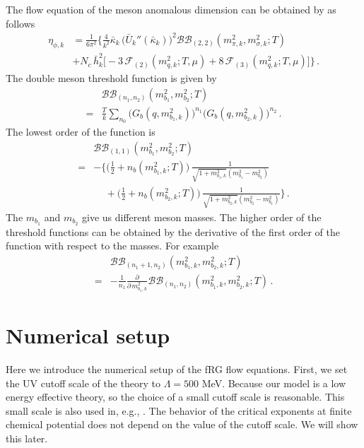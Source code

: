 \documentclass[aps,twocolumn,prd,superscriptaddress,nofootinbib,floatfix]{revtex4-2}
\def\Eq#1{\Cref{#1}}
\begin{document}
The flow equation of the meson anomalous dimension can be obtained by \Eq{eq:eta_phi} as follows
%
\begin{align}
\eta_{\phi,k}&=\frac{1}{6\pi^2}\bigg\{\frac{4}{k^2}\bar{\kappa}_k\,\big(\bar{U}_k''(\bar{\kappa}_k)\big)^2\mathcal{BB}_{(2,2)}(m^2_{\pi,k},m^2_{\sigma,k};T)\nonumber\\[2ex]
&+N_c\,\bar{h}_k^2\Big[-3\,\mathcal{F}_{(2)}(m^2_{q,k};T,\mu)+8\,\mathcal{F}_{(3)}(m^2_{q,k};T,\mu)\Big]
\bigg\}\,.
\end{align}
%
The double meson threshold function is given by
%
\begin{align}
&\mathcal{BB}_{(n_1,n_2)}(m_{b_1}^2,m_{b_2}^2;T)\nonumber\\[2ex]
=&\frac{T}{k}\sum_{n_0}\bigg(G_b(q,m^2_{b_1,k})\bigg)^{n_1}\bigg(G_b(q,m^2_{b_2,k})\bigg)^{n_2}\,.
\end{align}
%
The lowest order of the function is
%
\begin{align}
&\mathcal{BB}_{(1,1)}(m^2_{b_1},m^2_{b_2};T)\nonumber\\[2ex]
=&-\bigg\{\bigg(\frac{1}{2}+n_b(m^2_{b_1,k};T)\bigg)\,\frac{1}{\sqrt{1+m^2_{b_1,k}}(m^2_{b_1}-m^2_{b_2})}\nonumber\\[2ex]
&\,\,\,\,\,\,\,+\bigg(\frac{1}{2}+n_b(m^2_{b_2,k};T)\bigg)\,\frac{1}{\sqrt{1+m^2_{b_2,k}}(m^2_{b_2}-m^2_{b_1})}
\bigg\}\,.
\end{align}
%
The $m_{b_1}$ and $m_{b_2}$ give us different meson masses. The higher order of the threshold functions can be obtained by the derivative of the first order of the function with respect to the masses. For example
%
\begin{align}
&\mathcal{BB}_{(n_1+1,n_2)}(m^2_{b_1,k},m^2_{b_2,k};T)\nonumber\\[2ex]
=&-\frac{1}{n_1}\frac{\partial}{\partial\,m^2_{b_1,k}}\mathcal{BB}_{(n_1,n_2)}(m^2_{b_1,k},m^2_{b_2,k};T)\,.
\end{align}
%
\section{Numerical setup}
\label{app:numerical}
Here we introduce the numerical setup of the fRG flow equations. First, we set the UV cutoff scale of the theory to $\Lambda=500$ MeV. Because our model is a low energy effective theory, so the choice of a small cutoff scale is reasonable. This small scale is also used in, e.g., \cite{Chen:2021iuo}. The behavior of the critical exponents at finite chemical potential does not depend on the value of the cutoff scale. We will show this later.
\end{document}
